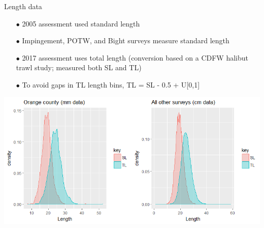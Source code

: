 \documentclass[ignorenonframetext,]{beamer}
\begin{document}
\begin{frame}{Length data}

\begin{itemize}
\item[$\bullet$] 2005 assessment used standard length
\item[$\bullet$] Impingement, POTW, and Bight surveys measure standard length
\item[$\bullet$] 2017 assessment uses total length (conversion based on a CDFW halibut trawl study; measured both SL and TL)
\item[$\bullet$] To avoid gaps in TL length bins, TL = SL - 0.5 + U[0,1] 
\end{itemize}

\includegraphics[height=.5\textheight]{Figures/SL_to_TL_compare.png}

\end{frame}
\end{document}
